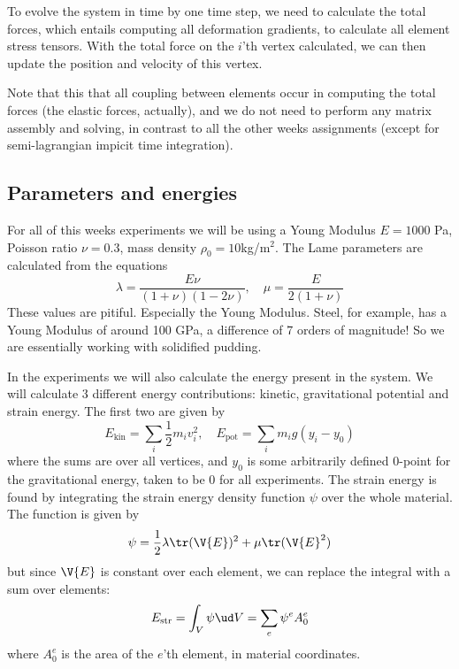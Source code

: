 \documentclass[sigconf]{acmart}
\begin{document}
To evolve the system in time by one time step, we need to calculate the total forces, which entails computing all deformation gradients, to calculate all element stress tensors. With the total force on the $ i $'th vertex calculated, we can then update the position and velocity of this vertex.

Note that this that all coupling between elements occur in computing the total forces (the elastic forces, actually), and we do not need to perform any matrix assembly and solving, in contrast to all the other weeks assignments (except for semi-lagrangian impicit time integration).

\subsection{Parameters and energies}
For all of this weeks experiments we will be using a Young Modulus $ E =1000 $ Pa, Poisson ratio $ \nu=0.3 $, mass density $ \rho_0=10  $kg/m$ ^2 $. The Lame parameters are calculated from the equations
\begin{equation}\label{key}
	\lambda = \frac{E\nu}{(1+\nu)(1-2\nu)}, \quad \mu=\frac{E}{2(1+\nu)}
\end{equation}
These values are pitiful. Especially the Young Modulus. Steel, for example, has a Young Modulus of around 100 GPa, a difference of 7 orders of magnitude! So we are essentially working with solidified pudding.

In the experiments we will also calculate the energy present in the system. We will calculate 3 different energy contributions: kinetic, gravitational potential and strain energy. The first two are given by
\begin{equation}\label{key}
	E_{\text{kin}} = \sum_{i} \frac{1}{2} m_i v_i^2, \quad E_{\text{pot}} = \sum_{i} m_i g (y_i-y_0)
\end{equation}
where the sums are over all vertices, and $ y_0 $ is some arbitrarily defined 0-point for the gravitational energy, taken to be 0 for all experiments. The strain energy is found by integrating the strain energy density function $ \psi $ over the whole material. The function is given by
\begin{equation}\label{key}
\psi = \frac{1}{2} \lambda \tr (\V{E})^2 + \mu \tr (\V{E}^2)
\end{equation}
but since $ \V{E} $ is constant over each element, we can replace the integral with a sum over elements:
\begin{equation}\label{key}
	E_{\text{str}} = \int_V \psi \ud V = \sum_{e} \psi^e A^e_0
\end{equation}
where $ A^e_0 $ is the area of the $ e $'th element, in material coordinates.
\end{document}
